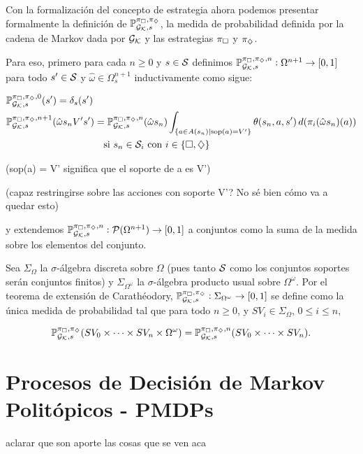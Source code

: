\begin{boxamarillo}{}
	Con la formalización del concepto de estrategia ahora podemos presentar
	formalmente la definición de $\mathbb{P}_{\mathcal{G}_{\mathcal{K}}, s}^{\pi_\square, \pi_\diamondsuit}$, la medida de probabilidad definida por
	la cadena de Markov dada por $\mathcal{G}_{\mathcal{K}}$ y las estrategias $\pi_\square$ y $\pi_\diamondsuit$.

	Para eso, primero para cada $n \geq 0$ y $s \in \mathcal{S}$ definimos $\mathbb{P}^{\pi_\square,
			\pi_\diamondsuit, n}_{\mathcal{G}_{\mathcal{K}}, s} : \Omega^{n+1} \rightarrow [0, 1]$ para todo $s' \in \mathcal{S}$
	y $\hat{\omega} \in \Omega_s^{n+1}$ inductivamente como sigue:

	\begin{align*}
		&\mathbb{P}^{\pi_\square, \pi_\diamondsuit, 0}_{\mathcal{G}_{\mathcal{K}}, s}(s') = \delta_s(s') \\
		&\mathbb{P}^{\pi_\square, \pi_\diamondsuit, n+1}_{\mathcal{G}_{\mathcal{K}}, s}(\hat{\omega}s_nV's') = \mathbb{P}^{\pi_\square, \pi_\diamondsuit, n}_{\mathcal{G}_{\mathcal{K}}, s}(\hat{\omega} s_n) \int_{\{ a \in A(s_n) \mid \text{sop}(a) = V'\}} \theta(s_n, a, s') \, d(\pi_i(\hat{\omega}s_n)(a)) \\ & \qquad \qquad \qquad \qquad \qquad \text{si } s_n \in \mathcal{S}_i \text{ con } i \in \{\square, \diamondsuit\}
	\end{align*}

	(sop(a) = V' significa que el soporte de a es V')

	(capaz restringirse sobre las acciones con soporte V'? No sé bien cómo va a quedar esto)

	y extendemos \( \mathbb{P}^{\pi_\square, \pi_\diamondsuit, n}_{\mathcal{G}_{\mathcal{K}}, s} :
	\mathcal{P}(\Omega^{n+1}) \to [0, 1] \) a conjuntos como la suma de la medida
	sobre los elementos del conjunto.

	Sea \( \Sigma_\Omega \) la \( \sigma \)-álgebra discreta sobre \( \Omega \)
	(pues tanto $\mathcal{S}$ como los conjuntos soportes serán conjuntos finitos) y \(
	\Sigma_{\Omega^\omega} \) la \( \sigma \)-álgebra producto usual sobre \(
	\Omega^\omega \). Por el teorema de extensión de Carathéodory, \(
	\mathbb{P}^{\pi_\square, \pi_\diamondsuit}_{\mathcal{G}_{\mathcal{K}}, s} : \Sigma_{\Omega^\omega} \to [0, 1] \) se
	define como la única medida de probabilidad tal que para todo \( n \geq 0 \), y
	\( SV_i \in \Sigma_\Omega \), \( 0 \leq i \leq n \),

	\[
		\mathbb{P}^{\pi_\square, \pi_\diamondsuit}_{\mathcal{G}_{\mathcal{K}}, s}(SV_0 \times \dots \times SV_n \times \Omega^\omega) = \mathbb{P}^{\pi_\square, \pi_\diamondsuit, n}_{\mathcal{G}_{\mathcal{K}}, s}(SV_0 \times \dots \times SV_n).
	\]
\end{boxamarillo}

\section{Procesos de Decisión de Markov Politópicos - PMDPs}
aclarar que son aporte las cosas que se ven aca

